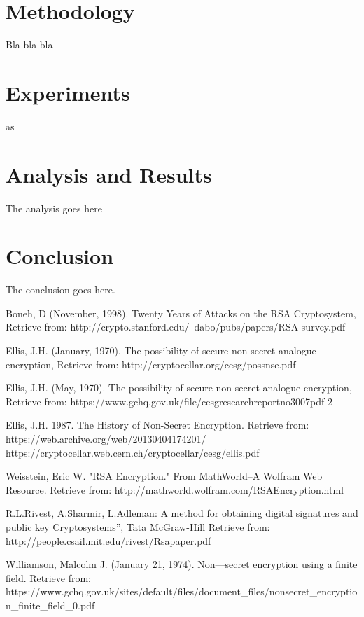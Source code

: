 \documentclass[conference,compsoc, 10pt]{IEEEtran}
\begin{document}
\section{Methodology}
Bla bla bla

\section{Experiments}
as

\section{Analysis and Results}
The analysis goes here

\section{Conclusion}
The conclusion goes here.

\large
\begin{thebibliography}{1}
Boneh, D (November, 1998). Twenty Years of Attacks on the RSA Cryptosystem, Retrieve from: http://crypto.stanford.edu/~dabo/pubs/papers/RSA-survey.pdf

Ellis, J.H. (January, 1970). The possibility of secure non-secret analogue encryption, Retrieve from: http://cryptocellar.org/cesg/possnse.pdf

Ellis, J.H. (May, 1970). The possibility of secure non-secret analogue encryption, Retrieve from: https://www.gchq.gov.uk/file/cesgresearchreportno3007pdf-2

Ellis, J.H. 1987. The History of Non-Secret Encryption. Retrieve from: https://web.archive.org/web/20130404174201/\newline
https://cryptocellar.web.cern.ch/cryptocellar/cesg/ellis.pdf

Weisstein, Eric W. "RSA Encryption." From MathWorld--A Wolfram Web Resource. Retrieve from: http://mathworld.wolfram.com/RSAEncryption.html

R.L.Rivest, A.Sharmir, L.Adleman: A method for obtaining digital signatures and public key Cryptosystems”, Tata McGraw-Hill Retrieve from: http://people.csail.mit.edu/rivest/Rsapaper.pdf

Williamson, Malcolm J. (January 21, 1974). Non—secret encryption using a finite field. Retrieve from:
https://www.gchq.gov.uk/sites/default/files/document\_files/\newline nonsecret\_encryption\_finite\_field\_0.pdf

\end{thebibliography}
\end{document}
